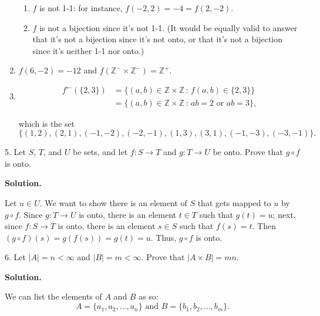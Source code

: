 \documentclass[10pt,]{book}
\theoremstyle{plain}
\theoremstyle{definition}
\theoremstyle{definition}
\theoremstyle{definition}
\theoremstyle{definition}
\numberwithin{equation}{section}
\def\Z{\mathbb{Z}}
\newcommand{\lt}{ < }
\newcommand{\amp}{ & }
\begin{document}
\begin{exerciselist}
\begin{enumerate}[label=(\alph*)]
\begin{enumerate}[label=\roman*.]
\item\hypertarget{li-49}{}
            \(f\) is not 1-1: for instance, \(f(-2,2)=-4=f(2,-2)\).
\item\hypertarget{li-50}{}
            \(f\) is not a bijection since it's not 1-1. (It would be equally valid to answer that it's not a bijection since it's not onto, or that it's not a bijection since it's neither 1-1 nor onto.)
\end{enumerate}
%
\item\hypertarget{li-51}{}
        \(f(6,-2)=-12\) and \(f(\Z^-\times \Z^-)=\Z^+\).
\item\hypertarget{li-52}{}
\begin{align*}
f^{\leftarrow}(\{2,3\})\amp =\{(a,b)\in \Z\times \Z\,:\, f(a,b)\in \{2,3\}\}\\
\amp =\{(a,b)\in \Z\times \Z\,:\, ab=2 \mbox{ or }  ab=3\},
\end{align*}

        which is the set
\begin{equation*}
\{(1,2),(2,1),(-1,-2),(-2,-1),(1,3),(3,1),(-1,-3),(-3,-1)\}.
\end{equation*}

\end{enumerate}
\item[5.]\hypertarget{exercise-5}{}
        Let \(S\), \(T\), and \(U\) be sets, and let \(f: S\to T\) and \(g: T\to U\) be onto. Prove that \(g \circ f\) is onto.
\par\smallskip
\par\smallskip
\noindent\textbf{Solution.}\hypertarget{solution-5}{}\quad

      Let \(u\in U\). We want to show there is an element of \(S\) that gets mapped to \(u\) by \(g\circ f\). Since \(g:T\to U\) is onto, there is an element \(t\in T\) such that \(g(t)=u\); next, since \(f:S\to T\) is onto, there is an element \(s\in S\) such that \(f(s)=t\). Then \((g\circ f)(s)=g(f(s))=g(t)=u\). Thus, \(g\circ f\) is onto.
\item[6.]\hypertarget{exercise-6}{}
        Let \(|A|=n\lt \infty\) and \(|B|=m\lt  \infty\). Prove that \(|A\times B|=mn\).
\par\smallskip
\par\smallskip
\noindent\textbf{Solution.}\hypertarget{solution-6}{}\quad

      We can list the elements of \(A\) and \(B\) as so:
\begin{equation*}
 A=\{a_1,a_2,\ldots, a_n\} \mbox{ and } B=\{b_1,b_2,\ldots, b_m\}.
\end{equation*}


\end{exerciselist}
\end{document}
